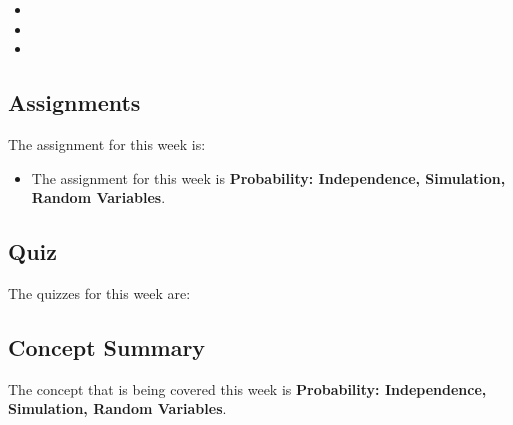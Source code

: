\begin{itemize}
    \item {}
    \item {}
    \item {}
\end{itemize}

\subsection{Assignments}

The assignment for this week is:

\begin{itemize}
    \item The assignment for this week is \textbf{Probability: Independence, Simulation, Random Variables}. 
\end{itemize}

\subsection{Quiz}

The quizzes for this week are:

\begin{itemize}
     \textbullet {} 
\end{itemize}

\subsection{Concept Summary}

The concept that is being covered this week is \textbf{Probability: Independence, Simulation, Random Variables}.

